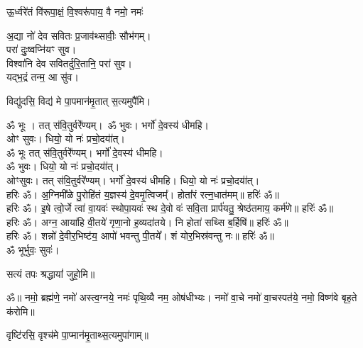 
{ऊ॒र्ध्वरे॑तं वि॑रूपा॒क्षं॒ वि॒श्वरू॑पाय॒ वै नमो॒ नमः॑}




अ॒द्या नो॑ देव सवितः प्र॒जाव॑थ्सावीः॒ सौभ॑गम्।\\
परा॑ दुः॒ष्वप्नि॑यꣳ सुव।\\
विश्वा॑नि देव सवितर्दुरि॒तानि॒ परा॑ सुव।\\
यद्भ॒द्रं तन्म॒ आ सु॑व।


विद्यु॑दसि॒ विद्य॑ मे पा॒पमान॑मृ॒तात् स॒त्यमुपै॑मि।


ॐ भूः । तत् स॑वि॒तुर्वरे॑॑ण्यम्।\
ॐ भुवः। भर्गो॑ दे॒वस्य॑ धीमहि।\\
ओꣳ सुवः। धियो॒ यो नः॑ प्रचो॒दया॑॑त्।\\
ॐ भूः तत् स॑वि॒तुर्वरे॑॑ण्यम्। भर्गो॑ दे॒वस्य॑ धीमहि।\\
ॐ भुवः। धियो॒ यो नः॑ प्रचो॒दया॑॑त्।\\
ओꣳसुवः। तत् स॑वि॒तुर्वरे॑॑ण्यम्। भर्गो॑ दे॒वस्य॑ धीमहि। धियो॒ यो नः॑ प्रचो॒दया॑॑त्।\\

हरिः ॐ। अ॒ग्निमी᳚ळे पु॒रोहि॑तं य॒ज्ञस्य॑ दे॒वमृ॒त्विजम्᳚। होता᳚रं रत्न॒\-धात॑मम्॥ हरिः॑ ॐ॥\\

हरिः ॐ। इ॒षे त्वो॒र्जे त्वा॑ वा॒यवः॑ स्थोपा॒यवः॑ स्थ दे॒वो वः॑ सवि॒ता प्रार्प॑यतु॒ श्रेष्ठ॑तमाय॒ कर्म॑णे॥ हरिः॑ ॐ॥ \\

हरिः ॐ। अग्न॒ आया॑हि वी॒तये॑ गृणा॒नो ह॒व्यदा॑तये। नि होता॑ सथ्सि ब॒र्हिषि॑॥ हरिः॑ ॐ॥\\

हरिः ॐ। शन्नो॑ दे॒वीर॒भिष्ट॑य॒ आपो॑ भवन्तु पी॒तये᳚। शं योर॒भिस्र॑वन्तु नः॥ हरिः॑ ॐ॥\\

ॐ भूर्भुवः॒ सुवः॑।

सत्यं तपः श्रद्धायां॑ जुहो॒मि॥


ॐ॥ नमो॒ ब्रह्म॑णे॒ नमो॑ अस्त्व॒ग्नये॒ नमः॑ पृथि॒व्यै नम॒ ओष॑धीभ्यः।
नमो॑ वा॒चे नमो॑ वा॒चस्पत॑ये॒ नमो॒ विष्ण॑वे बृह॒ते क॑रोमि॥

वृष्टि॑रसि॒ वृश्च॑मे पा॒प्मान॑मृ॒ताथ्स॒त्यमुपा॑गाम्॥
